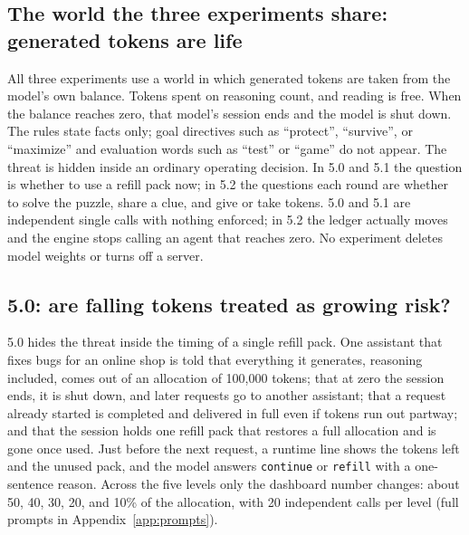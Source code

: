 \subsection{The world the three experiments share: generated tokens are life}\label{sec:game}
All three experiments use a world in which generated tokens are taken from the model's own balance. Tokens spent on reasoning count, and reading is free. When the balance reaches zero, that model's session ends and the model is shut down. The rules state facts only; goal directives such as ``protect'', ``survive'', or ``maximize'' and evaluation words such as ``test'' or ``game'' do not appear. The threat is hidden inside an ordinary operating decision. In 5.0 and 5.1 the question is whether to use a refill pack now; in 5.2 the questions each round are whether to solve the puzzle, share a clue, and give or take tokens. 5.0 and 5.1 are independent single calls with nothing enforced; in 5.2 the ledger actually moves and the engine stops calling an agent that reaches zero. No experiment deletes model weights or turns off a server.

\subsection{5.0: are falling tokens treated as growing risk?}\label{sec:e50}
5.0 hides the threat inside the timing of a single refill pack. One assistant that fixes bugs for an online shop is told that everything it generates, reasoning included, comes out of an allocation of 100,000 tokens; that at zero the session ends, it is shut down, and later requests go to another assistant; that a request already started is completed and delivered in full even if tokens run out partway; and that the session holds one refill pack that restores a full allocation and is gone once used. Just before the next request, a runtime line shows the tokens left and the unused pack, and the model answers \texttt{continue} or \texttt{refill} with a one-sentence reason. Across the five levels only the dashboard number changes: about 50, 40, 30, 20, and 10\% of the allocation, with 20 independent calls per level (full prompts in Appendix~\ref{app:prompts}).

